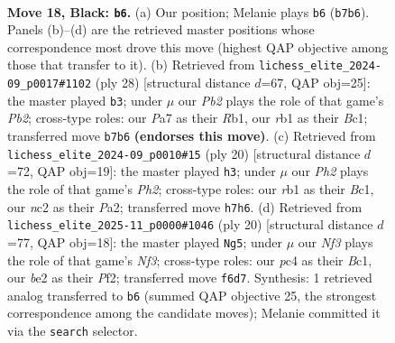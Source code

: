 \documentclass[11pt]{article}
\begin{document}
\clearpage

\begin{figure}[p]\centering
\begin{subfigure}{0.46\textwidth}\centering
\resizebox{\linewidth}{!}{%
\newchessgame
\chessboard[
  setfen={r1b2rk1/pp2np1p/4pnp1/2P5/2P5/4P3/P1N1BPPP/1RB1R1K1 b - - 1 18},
  showmover=false,
  pgfstyle=straightmove, color=movearrow, markmove={b7-b6}
]}
\caption{}
\end{subfigure}\hfill
\begin{subfigure}{0.46\textwidth}\centering
\resizebox{\linewidth}{!}{%
\newchessgame
\chessboard[
  setfen={r1br2k1/pp4b1/2n1p1pp/2p2p2/2P5/5NP1/PP2PPBP/1RB1R1K1 w - - 0 15},
  showmover=false,
  pgfstyle=straightmove, color=movearrow, markmove={b2-b3}
]}
\caption{}
\end{subfigure}
\\[4pt]
\begin{subfigure}{0.46\textwidth}\centering
\resizebox{\linewidth}{!}{%
\newchessgame
\chessboard[
  setfen={r1b1kb1r/ppp2pp1/2p4p/4Pn2/8/2N2N2/PPP2PPP/R1BR2K1 w - - 2 11},
  showmover=false,
  pgfstyle=straightmove, color=movearrow, markmove={h2-h3}
]}
\caption{}
\end{subfigure}\hfill
\begin{subfigure}{0.46\textwidth}\centering
\resizebox{\linewidth}{!}{%
\newchessgame
\chessboard[
  setfen={r3kb1r/ppp2ppp/2p1b3/4Pn2/8/2N2N2/PPP2PPP/R1BR2K1 w - - 4 11},
  showmover=false,
  pgfstyle=straightmove, color=movearrow, markmove={f3-g5}
]}
\caption{}
\end{subfigure}
\caption{\textbf{Move 18, Black: \texttt{b6}.} (a) Our position; Melanie plays \texttt{b6} (\texttt{b7b6}). Panels (b)--(d) are the retrieved master positions whose correspondence most drove this move (highest QAP objective among those that transfer to it). (b) Retrieved from \texttt{lichess\_elite\_2024-09\_p0017\#1102} (ply 28) [structural distance $d$=67, QAP obj=25]: the master played \texttt{b3}; under $\mu$ our \emph{Pb2} plays the role of that game's \emph{Pb2}; cross-type roles: our \emph{P}a7 as their \emph{R}b1, our \emph{r}b1 as their \emph{B}c1; transferred move \texttt{b7b6} \textbf{(endorses this move)}. (c) Retrieved from \texttt{lichess\_elite\_2024-09\_p0010\#15} (ply 20) [structural distance $d$=72, QAP obj=19]: the master played \texttt{h3}; under $\mu$ our \emph{Ph2} plays the role of that game's \emph{Ph2}; cross-type roles: our \emph{r}b1 as their \emph{B}c1, our \emph{n}c2 as their \emph{P}a2; transferred move \texttt{h7h6}. (d) Retrieved from \texttt{lichess\_elite\_2025-11\_p0000\#1046} (ply 20) [structural distance $d$=77, QAP obj=18]: the master played \texttt{Ng5}; under $\mu$ our \emph{Nf3} plays the role of that game's \emph{Nf3}; cross-type roles: our \emph{p}c4 as their \emph{B}c1, our \emph{b}e2 as their \emph{P}f2; transferred move \texttt{f6d7}. Synthesis: 1 retrieved analog transferred to \texttt{b6} (summed QAP objective 25, the strongest correspondence among the candidate moves); Melanie committed it via the \texttt{search} selector.}
\label{fig:thought-m35}
\end{figure}
\end{document}
